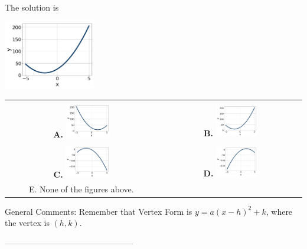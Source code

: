 \documentclass{article}[14pt]
\begin{document}
 
 The solution is  
 \begin{center} \includegraphics[width=0.3\textwidth]{../Figures/quadraticEquationToGraphBC.png} \end{center}\begin{tabular}{|c|c|} 
\hline 
 & \tabularnewline 
 \textbf{A.} \includegraphics[width=0.3\textwidth]{../Figures/quadraticEquationToGraphAC.png} & \textbf{B.} \includegraphics[width=0.3\textwidth]{../Figures/quadraticEquationToGraphBC.png} \tabularnewline 
\hline 
 & \tabularnewline 
 \textbf{C.} \includegraphics[width=0.3\textwidth]{../Figures/quadraticEquationToGraphCC.png} & \textbf{D.} \includegraphics[width=0.3\textwidth]{../Figures/quadraticEquationToGraphDC.png} \tabularnewline 
\hline 
 E. None of the figures above. & \tabularnewline 
\hline 
 \end{tabular} 
 
General Comments: Remember that Vertex Form is $y = a(x-h)^2+k$, where the vertex is $(h, k)$.

-----------------------------------------------
\end{document}
